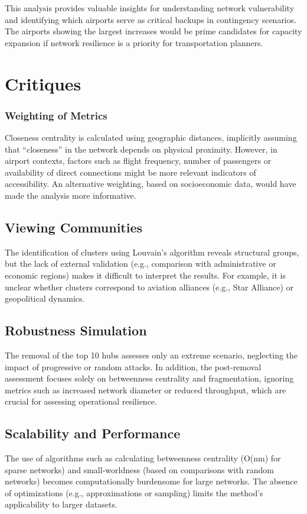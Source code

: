 \documentclass[12pt]{article}
\begin{document}
    This analysis provides valuable insights for understanding network vulnerability and identifying which airports serve as critical backups in contingency scenarios. The airports showing the largest increases would be prime candidates for capacity expansion if network resilience is a priority for transportation planners.


    \section{Critiques}\label{sec:critiques}
        \subsubsection{Weighting of Metrics}
            Closeness centrality is calculated using geographic distances, implicitly assuming that “closeness” in the network depends on physical proximity. However, in airport contexts, factors such as flight frequency, number of passengers or availability of direct connections might be more relevant indicators of accessibility. An alternative weighting, based on socioeconomic data, would have made the analysis more informative.
        \subsection{Viewing Communities}
            The identification of clusters using Louvain's algorithm reveals structural groups, but the lack of external validation (e.g., comparison with administrative or economic regions) makes it difficult to interpret the results. For example, it is unclear whether clusters correspond to aviation alliances (e.g., Star Alliance) or geopolitical dynamics.
        \subsection{Robustness Simulation}
            The removal of the top 10 hubs assesses only an extreme scenario, neglecting the impact of progressive or random attacks. In addition, the post-removal assessment focuses solely on betweenness centrality and fragmentation, ignoring metrics such as increased network diameter or reduced throughput, which are crucial for assessing operational resilience.
        \subsection{Scalability and Performance}
            The use of algorithms such as calculating betweenness centrality (O(nm) for sparse networks) and small-worldness (based on comparisons with random networks) becomes computationally burdensome for large networks. The absence of optimizations (e.g., approximations or sampling) limits the method's applicability to larger datasets.
\end{document}
